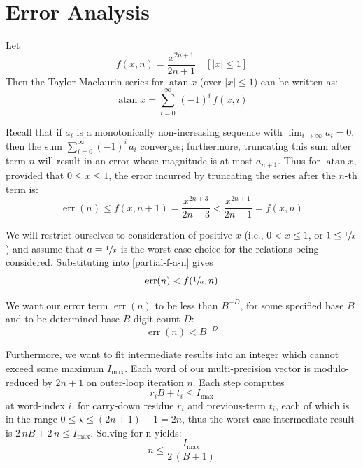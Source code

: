 \documentclass{report}
\newcommand{\vbreak}{\vspace{4ex}}
\newcommand{\Imax}{\ensuremath{I_\text{max}}}
\DeclareMathOperator{\atan}{atan}
\DeclareMathOperator{\err}{err}
\begin{document}
\chapter{Error Analysis}
Let
\begin{equation}\label{function-f}
  f(x, n) = \frac{x^{2n+1}}{2n+1}
            \quad  [|x| \le 1]
\end{equation}
Then the Taylor-Maclaurin series for $\atan x$ (over $|x| \le 1$)
can be written as:
\begin{equation*}
  \atan x = \sum_{i=0}^{\infty} \,(-1)^i\, f(x, i)
\end{equation*}

Recall that if $a_i$ is a monotonically non-increasing sequence
with $\lim_{i\to\infty} a_i = 0$,
then the sum $\sum_{i=0}^\infty (-1)^i\, a_i$ converges;
furthermore, truncating this sum after term $n$
will result in an error whose magnitude is at most $a_{n+1}$.
Thus for $\atan x$, provided that $0 \le x \le 1$,
the error incurred by truncating the series after the $n$-th term is:
\begin{equation}\label{partial-f-a-n}
  \err(n)
    \le f(x,n+1) = \frac{x^{2 n+3}}{2 n+3}
    <   \frac{x^{2 n+1}}{2 n+1} = f(x,n)
\end{equation}

We will restrict ourselves to consideration of positive $x$
(i.e., $0 < x \le 1$, or $1 \le \sfrac{1}{x}$)
and assume that $a=\sfrac{1}{x}$ is the worst-case choice
for the relations being considered.
Substituting into \eqref{partial-f-a-n} gives
\begin{equation}\label{constraint-1}
  \err(n) < f(\sfrac{1}{a},n)
\end{equation}

\vbreak
We want our error term $\err(n)$ to be less than $B^{-D}$,
for some specified base $B$ and
to-be-determined base-$B$-digit-count $D$:
\begin{equation}\label{target}
  \err(n) < B^{-D}
\end{equation}

Furthermore, we want to fit intermediate results
into an integer which cannot exceed some maximum \Imax.
Each word of our multi-precision vector is
modulo-reduced by $2 n+1$ on outer-loop iteration $n$.
Each step computes
\begin{equation*}
  r_i B + t_i \le \Imax
\end{equation*}
at word-index $i$,
for carry-down residue $r_i$ and previous-term $t_i$,
each of which is in the range $0 \le \star \le (2 n+1) - 1 = 2 n$,
thus the worst-case intermediate result is
\( 2\, n B + 2\, n \le \Imax \).
Solving for n yields:
\begin{equation}\label{n-terms}
  n \le \frac{\Imax}{2\,(B+1)}
\end{equation}
\end{document}
